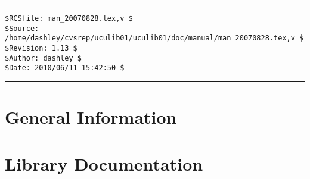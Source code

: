 \documentclass[letterpaper,10pt,titlepage]{custbook}
\begin{document}
%

%

%
%
\vspace{-0.45in}
%
\noindent\begin{minipage}{\textwidth}
\noindent\rule[-0.25in]{\textwidth}{1pt}
\begin{tiny}
\begin{verbatim}
$RCSfile: man_20070828.tex,v $
$Source: /home/dashley/cvsrep/uculib01/uculib01/doc/manual/man_20070828.tex,v $
$Revision: 1.13 $
$Author: dashley $
$Date: 2010/06/11 15:42:50 $
\end{verbatim}
\end{tiny}
\noindent\rule[0.25in]{\textwidth}{1pt}
\end{minipage}
%
\frontmatter{}
%

%

%
\tableofcontents
%
\listoftables
%
\listoffigures
%
%
\mainmatter{}
%
\part{General Information}



\part{Library Documentation}
















\end{document}
